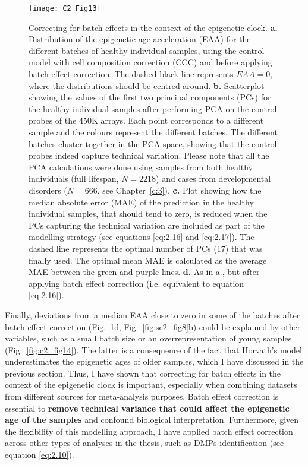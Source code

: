 \begin{figure}[htbp!] 
	\centering
	\texttt{[image: C2\_Fig13]}
	\vspace*{2mm}    
	\caption[Correcting for batch effects in the context of the epigenetic clock]{Correcting for batch effects in the context of the epigenetic clock. \textbf{a.} Distribution of the epigenetic age acceleration (EAA) for the different batches of healthy individual samples, using the control model with cell composition correction (CCC) and before applying batch effect correction. The dashed black line represents $EAA = 0$, where the distributions should be centred around. \textbf{b.} Scatterplot showing the values of the first two principal components (PCs) for the healthy individual samples after performing PCA on the control probes of the 450K arrays. Each point corresponds to a different sample and the colours represent the different batches. The different batches cluster together in the PCA space, showing that the control probes indeed capture technical variation. Please note that all the PCA calculations were done using samples from both healthy individuals (full lifespan, $N=2218$) and cases from developmental disorders ($N=666$, see Chapter~\ref{c:3}). \textbf{c.} Plot showing how the median absolute error (MAE) of the prediction in the healthy individual samples, that should tend to zero, is reduced when the PCs capturing the technical variation are included as part of the modelling strategy (see equations \ref{eq:2.16} and \ref{eq:2.17}). The dashed line represents the optimal number of PCs (17) that was finally used. The optimal mean MAE is calculated as the average MAE between the green and purple lines. \textbf{d.} As in a., but after applying batch effect correction (i.e. equivalent to equation \ref{eq:2.16}).}
	\label{fig:c2_fig13}
\end{figure}

\bigskip

Finally, deviations from a median EAA close to zero in some of the batches after batch effect correction (Fig.~\ref{fig:c2_fig13}d, Fig.~\ref{fig:sc2_fig8}b) could be explained by other variables, such as a small batch size or an overrepresentation of young samples (Fig.~\ref{fig:c2_fig14}). The latter is a consequence of the fact that Horvath’s model underestimates the epigenetic ages of older samples, which I have discussed in the previous section. Thus, I have shown that correcting for batch effects in the context of the epigenetic clock is important, especially when combining datasets from different sources for meta-analysis purposes. Batch effect correction is essential to \textbf{remove technical variance that could affect the epigenetic age of the samples} and confound biological interpretation. Furthermore, given the flexibility of this modelling approach, I have applied batch effect correction across other types of analyses in the thesis, such as DMPs identification (see equation \ref{eq:2.10}).

